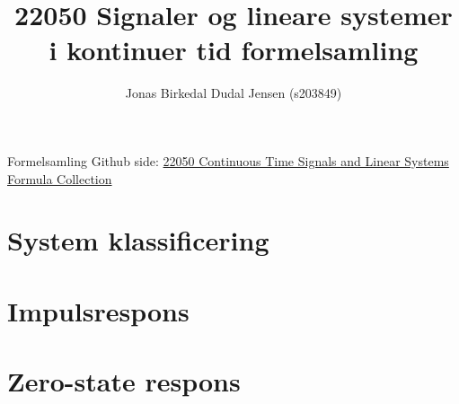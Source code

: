 \documentclass{article}
\title{22050 Signaler og lineare systemer i kontinuer tid formelsamling}
\date{}
\author{Jonas Birkedal Dudal Jensen (s203849)}
\begin{document}
	\maketitle
	\begin{center}
		Formelsamling Github side: \href{https://github.com/jondalnas/22050-Continuous-Time-Signals-and-Linear-Systems-Formula-Collection}{22050 Continuous Time Signals and Linear Systems Formula Collection}
	\end{center}

	\section{System klassificering}
	

	\section{Impulsrespons}
	

	\section{Zero-state respons}
	
\end{document}
